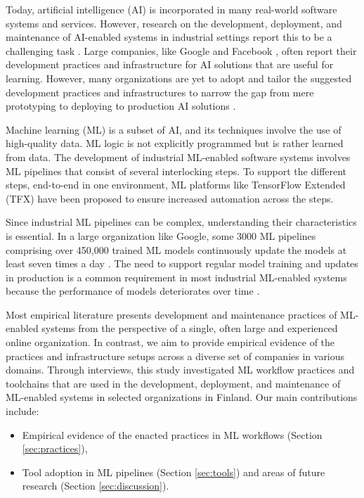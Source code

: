 Today, artificial intelligence (AI) is incorporated in many real-world software systems and services. However, research on the development, deployment, and maintenance of AI-enabled systems in industrial settings report this to be a challenging task \cite{Sculley2015, Lwakatare2019}. Large companies, like Google \cite{Baylor2017} and Facebook \cite{Hazelwood2018Facebook}, often report their development practices and infrastructure for AI solutions that are useful for learning. However, many organizations are yet to adopt and tailor the suggested development practices and infrastructures to narrow the gap from mere prototyping to deploying to production AI solutions \cite{Serban2020Practices}. 

Machine learning (ML) is a subset of AI, and its techniques involve the use of high-quality data. ML logic is not explicitly programmed but is rather learned from data. The development of industrial ML-enabled software systems involves ML pipelines that consist of several interlocking steps. To support the different steps, end-to-end in one environment, ML platforms like TensorFlow Extended (TFX) \cite{Baylor2017} have been proposed to ensure increased automation across the steps.

Since industrial ML pipelines can be complex, understanding their characteristics is essential. In a large organization like Google, some 3000 ML pipelines comprising over 450,000 trained ML models continuously update the models at least seven times a day  \cite{Doris2021MLPipelines}. The need to support regular model training and updates in production is a common requirement in most industrial ML-enabled systems because the performance of models deteriorates over time  \cite{Sculley2015}.

Most empirical literature presents development and maintenance practices of ML-enabled systems from the perspective of a single, often large and experienced online organization. In contrast, we aim to provide empirical evidence of the practices and infrastructure setups across a diverse set of companies in various domains. Through interviews, this study investigated ML workflow practices and toolchains that are used in the development, deployment, and maintenance of ML-enabled systems in selected organizations in Finland. Our main contributions include:
\begin{itemize}
    \item Empirical evidence of the enacted practices in ML workflows  (Section \ref{sec:practices}),
    \item Tool adoption in ML pipelines (Section \ref{sec:tools}) and areas of future research (Section \ref{sec:discussion}).
\end{itemize}
